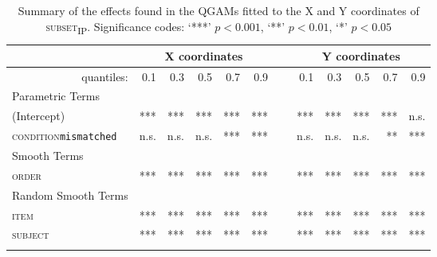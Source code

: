 \begin{table}\fontsize{9}{10}
\caption{Summary of the effects found in the QGAMs fitted to the X and Y coordinates of \textsc{subset\textsubscript{IP}}. Significance codes: `***' $p < 0.001$, `**' $p < 0.01$, `*' $p < 0.05$}
\label{tab:8.6}
\centering
\begin{tabular}{lrrrrrrrrrrr}
\lsptoprule
~                   & \multicolumn{5}{c}{X coordinates} & \multicolumn{1}{c}{}    & \multicolumn{5}{c}{Y coordinates}                               \\
\midrule
\multicolumn{1}{r}{quantiles:}          & 0.1        & 0.3        & 0.5        & 0.7        & 0.9 & ~        & 0.1        & 0.3        & 0.5        & 0.7        & 0.9         \\
\midrule
Parametric Terms    & \textbf{~} & \textbf{~} & \textbf{~} & \textbf{~} & \textbf{~} & \textbf{~} & \textbf{~} & \textbf{~} & \textbf{~} & \textbf{~}  \\
\midrule
(Intercept)         & ***        & ***        & ***        & ***        & *** & ~        & ***        & ***        & ***        & ***        & n.s.          \\
\textsc{condition}\texttt{mismatched} & n.s.       & n.s.          & n.s.        & ***        & *** & ~        & n.s.       & n.s.        & n.s.        & **        & ***         \\
\midrule
Smooth Terms        & \textbf{~} & \textbf{~} & \textbf{~} & \textbf{~} & \textbf{~} & \textbf{~} & \textbf{~} & \textbf{~} & \textbf{~} & \textbf{~}  \\
\midrule
\textsc{order}               & ***        & ***        & ***        & ***        & *** & ~        & ***        & ***        & ***        & ***        & ***         \\
\midrule
Random Smooth Terms & \textbf{~} & \textbf{~} & \textbf{~} & \textbf{~} & \textbf{~} & \textbf{~} & \textbf{~} & \textbf{~} & \textbf{~} & \textbf{~}  \\
\midrule
\textsc{item}                & ***        & ***        & ***        & ***        & *** & ~        & ***        & ***        & ***        & ***        & ***         \\
\textsc{subject}             & ***        & ***        & ***        & ***        & *** & ~        & ***        & ***        & ***        & ***        & ***        \\
\lspbottomrule
\end{tabular}
\end{table}

